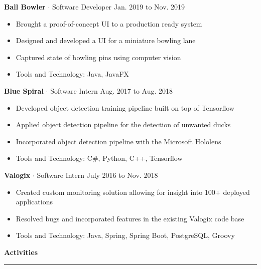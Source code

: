 \documentclass{article}
\newcommand{\rSection}[1] {
  \smallskip
  {\large\bfseries #1} \\
  \rule{\linewidth}{0.4pt}
}
\newcommand{\rSubSubSection}[1] {
  \textbf{#1}
}
\begin{document}
\vspace{1pt}
\rSubSubSection{Ball Bowler} $\cdot$ Software Developer \hfill Jan. 2019 to Nov. 2019 \par
\begin{itemize}[leftmargin=*]
    \item Brought a proof-of-concept UI to a production ready system
    \item Designed and developed a UI for a miniature bowling lane
    \item Captured state of bowling pins using computer vision
    \item Tools and Technology: Java, JavaFX
\end{itemize}

\vspace{1pt}
\rSubSubSection{Blue Spiral} $\cdot$ Software Intern \hfill Aug. 2017 to Aug. 2018 \par
\begin{itemize}[leftmargin=*]
    \item Developed object detection training pipeline built on top of Tensorflow
    \item Applied object detection pipeline for the detection of unwanted ducks
    \item Incorporated object detection pipeline with the Microsoft Hololens
    \item Tools and Technology: C\#, Python, C++, Tensorflow
\end{itemize}

\vspace{1pt}
\rSubSubSection{Valogix} $\cdot$ Software Intern \hfill July 2016 to Nov. 2018 \par
\begin{itemize}[leftmargin=*]
    \item Created custom monitoring solution allowing for insight into 100+ deployed applications
    \item Resolved bugs and incorporated features in the existing Valogix code base
    \item Tools and Technology: Java, Spring, Spring Boot, PostgreSQL, Groovy
\end{itemize}

\rSection{Activities} \par
\end{document}
